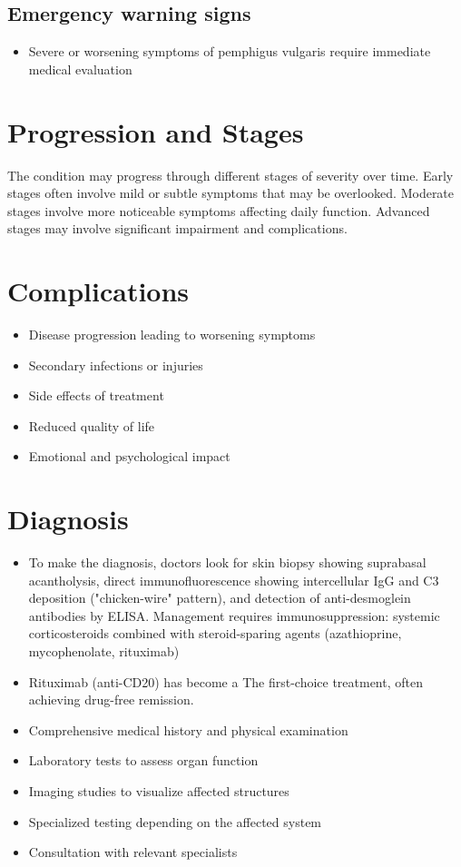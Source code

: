 \subsection{Emergency warning signs}
\begin{itemize}[noitemsep]
  \item Severe or worsening symptoms of pemphigus vulgaris require immediate medical evaluation
\end{itemize}
\section{Progression and Stages}
The condition may progress through different stages of severity over time. Early stages often involve mild or subtle symptoms that may be overlooked. Moderate stages involve more noticeable symptoms affecting daily function. Advanced stages may involve significant impairment and complications.
\section{Complications}
\begin{itemize}[noitemsep]
  \item Disease progression leading to worsening symptoms
  \item Secondary infections or injuries
  \item Side effects of treatment
  \item Reduced quality of life
  \item Emotional and psychological impact
\end{itemize}
\section{Diagnosis}
\begin{itemize}[noitemsep]
  \item To make the diagnosis, doctors look for skin biopsy showing suprabasal acantholysis, direct immunofluorescence showing intercellular IgG and C3 deposition ("chicken-wire" pattern), and detection of anti-desmoglein antibodies by ELISA. Management requires immunosuppression: systemic corticosteroids combined with steroid-sparing agents (azathioprine, mycophenolate, rituximab)
  \item Rituximab (anti-CD20) has become a The first-choice treatment, often achieving drug-free remission.
  \item Comprehensive medical history and physical examination
  \item Laboratory tests to assess organ function
  \item Imaging studies to visualize affected structures
  \item Specialized testing depending on the affected system
  \item Consultation with relevant specialists
\end{itemize}
